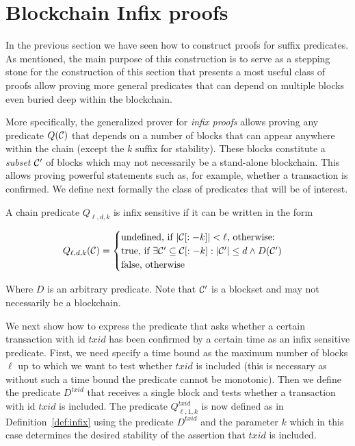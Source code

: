\section{Blockchain Infix proofs}

\label{sec:infix}


In the previous section we have seen how to construct proofs for suffix predicates. 
As mentioned, the main purpose of this construction is to serve as a stepping
stone for the construction of this section that presents 
a most useful class of
proofs allow proving more general predicates that can depend on multiple blocks
even buried deep within the blockchain.

More specifically, the generalized prover for
\textit{infix proofs} allows proving any predicate $Q(\mathcal{C})$ that depends on a
number of blocks that can appear anywhere within the chain (except the $k$
suffix for stability). These blocks constitute a \textit{subset} $\mathcal{C}'$ of
blocks which may not necessarily be a stand-alone blockchain. This allows
proving powerful statements such as, for example, whether a transaction is 
confirmed. 
We define next formally the class of predicates that will be of interest. 

\begin{definition}
\label{def:infix}
A chain predicate $Q_{\ell,d,k}$ is \textnormal{infix sensitive} if it can be
written in the form

$$
Q_{\ell,d,k}(\mathcal{C}) =
\begin{cases}
  \text{undefined, if } |\mathcal{C}[:-k]| < \ell \text{, otherwise:}\\
  \text{true, if }
    \exists \mathcal{C}' \subseteq \mathcal{C}[:-k]: |\mathcal{C}'| \leq d \land D(\mathcal{C}')\\
  \text{false, otherwise}
\end{cases}
$$

Where $D$ is an arbitrary predicate. Note that $\mathcal{C}'$ is a blockset and may
not necessarily be a blockchain.
\end{definition}

We next show how to express the predicate that asks whether 
a certain transaction with id $txid$ has been confirmed by a certain time as an infix sensitive predicate. 
First, we need specify a time bound  as the maximum number of blocks
$\ell$ up to which we want to test whether $txid$ is included (this is necessary as without such a time bound the predicate cannot be monotonic). Then we define the
 predicate $D^{txid}$ that receives  a single block and tests whether a transaction with id $txid$ is included. The predicate $Q^{txid}_{\ell, 1, k}$  is now defined
as in Definition~\ref{def:infix}  using the predicate $D^{txid}$ and the parameter $k$ which in this case  determines the desired stability of the assertion that $txid$ is included. 

